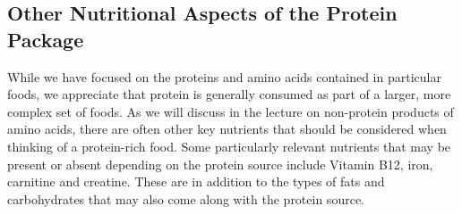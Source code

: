 \documentclass{tufte-handout}
\begin{document}
\subsection{Other Nutritional Aspects of the Protein Package}

While we have focused on the proteins and amino acids contained in particular foods, we appreciate that protein is generally consumed as part of a larger, more complex set of foods.  As we will discuss in the lecture on non-protein products of amino acids, there are often other key nutrients that should be considered when thinking of a protein-rich food.  Some particularly relevant nutrients that may be present or absent depending on the protein source include Vitamin B12, iron, carnitine and creatine.  These are in addition to the types of fats and carbohydrates that may also come along with the protein source. 



\end{document}
